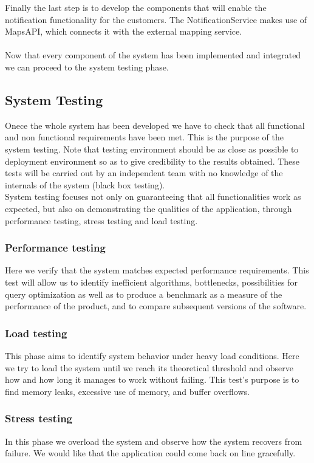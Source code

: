 Finally the last step is to develop the components that will enable the notification functionality for the customers. The NotificationService makes use of MapsAPI, which connects it with the external mapping service.\\\\
Now that every component of the system has been implemented and integrated we can proceed to the system testing phase.
\subsection{System Testing}
Onece the whole system has been developed we have to check that all functional and non functional requirements have been met. This is the purpose of the system testing. Note that testing environment should be as close as possible to deployment environment so as to give credibility to the results obtained. These tests will be carried out by an independent team with no knowledge of the internals of the system (black box testing).\\
System testing focuses not only on guaranteeing that all functionalities work as expected, but also on demonstrating the qualities of the application, through performance testing, stress testing and load testing.
\subsubsection{Performance testing}
Here we verify that the system matches expected performance requirements. This test will allow us to identify inefficient algorithms, bottlenecks, possibilities for query optimization as well as to produce a benchmark as a measure of the performance of the product, and to compare subsequent versions of the software.
\subsubsection{Load testing}
This phase aims to identify system behavior under heavy load conditions. Here we try to load the system until we reach its theoretical threshold and observe how and how long it manages to work without failing. This test's purpose is to find memory leaks, excessive use of memory, and buffer overflows.
\subsubsection{Stress testing}
In this phase we overload the system and observe how the system recovers from failure. We would like that the application could come back on line gracefully.
